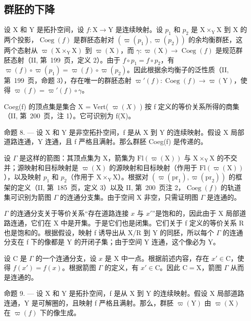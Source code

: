 \subsection{群胚的下降}

设 X 和 Y 是拓扑空间，设 \(f\colon\mathrm{X}\to\mathrm{Y}\) 是连续映射。设 \(p_{1}\) 和 \(p_{2}\) 是 \(\mathrm{X}\times_{\mathrm{Y}}\mathrm{X}\) 到 X 的两个投影，\(\operatorname{Coeg}(f)\) 是群胚态射对 \((\varpi(p_{1}),\varpi(p_{2}))\) 的余均衡群胚，这两个态射从 \(\varpi(\mathrm{X}\times_{\mathrm{Y}}\mathrm{X})\) 到 \(\varpi(\mathrm{X})\)，而 \(\gamma\colon\varpi(\mathrm{X})\to\operatorname{Coeg}(f)\) 是规范群胚态射（II, 第~199~页，定义 2）。由于 \(f\circ p_{1}=f\circ p_{2}\)，有 \(\varpi(f)\circ\varpi(p_{1})=\varpi(f)\circ\varpi(p_{2})\)。因此根据余均衡子的泛性质（II, 第~199~页，命题 3），存在唯一的群胚态射 \(\varpi'(f)\colon\operatorname{Coeg}(f)\to\varpi(\mathrm{Y})\)，使得 \(\varpi(f)=\varpi'(f)\circ\gamma\)。

Coeg(f) 的顶点集是集合 X = Vert( \(\varpi(X)\) ) 按 f 定义的等价关系所得的商集（II, 第~200~页，注 1）。它可识别为 f(X)。

命题 8. --- 设 X 和 Y 是非空拓扑空间，f 是从 X 到 Y 的连续映射。假设 X 局部道路连通，Y 连通，且 f 严格且满射。那么群胚 Coeg(f) 是传递的。

设 \(\Gamma\) 是这样的箭图：其顶点集为 X，箭集为 \(\mathrm{Fl}(\varpi(\mathrm{X}))\) 与 \(\mathrm{X}\times_{\mathrm{Y}}\mathrm{X}\) 的不交并；源映射和目标映射是 \(\varpi(\mathrm{X})\) 的源映射和目标映射（作用于 \(\mathrm{Fl}(\varpi(\mathrm{X}))\)），以及映射 \(p_1\) 和 \(p_2\)（作用于 \(\mathrm{X}\times_{\mathrm{Y}}\mathrm{X}\)）。根据对 \((\varpi(\mathrm{pr}_1), \varpi(\mathrm{pr}_2))\) 的框架的定义（II, 第~185~页，定义 3）以及 II, 第~200~页注 2，\(\operatorname{Coeg}(f)\) 的轨道集可识别为箭图 \(\Gamma\) 的连通分支集。由于空间 X 非空，只需证明图 \(\Gamma\) 是连通的。

\(\Gamma\) 的连通分支关于等价关系“存在道路连接 \(x\) 与 \(x'\)”是饱和的，因此由于 X 局部道路连通，它们在 X 中是开集。于是它们也是闭集。它们关于 f 定义的等价关系 R 也是饱和的。根据假设，映射 f 诱导出从 X/R 到 Y 的同胚，所以每个 \(\Gamma\) 的连通分支在 f 下的像都是 Y 的开闭子集；由于空间 Y 连通，这个像必为 Y。

设 C 是 \(\Gamma\) 的一个连通分支，设 \(x\) 是 X 中一点。根据前述内容，存在 \(x' \in \mathrm{C}\)，使得 \(f(x') = f(x)\)。根据箭图 \(\Gamma\) 的定义，有 \(x' \in \mathrm{C}\)。因此 \(\mathrm{C} = \mathrm{X}\)，箭图 \(\Gamma\) 从而是连通的。

命题 9. --- 设 X 和 Y 是拓扑空间，f 是从 X 到 Y 的连续映射。假设 X 局部道路连通，Y 是可解圈的，且映射 f 严格且满射。那么，群胚 \(\varpi(\mathrm{Y})\) 由 \(\varpi(\mathrm{X})\) 在 \(\varpi(f)\) 下的像生成。

